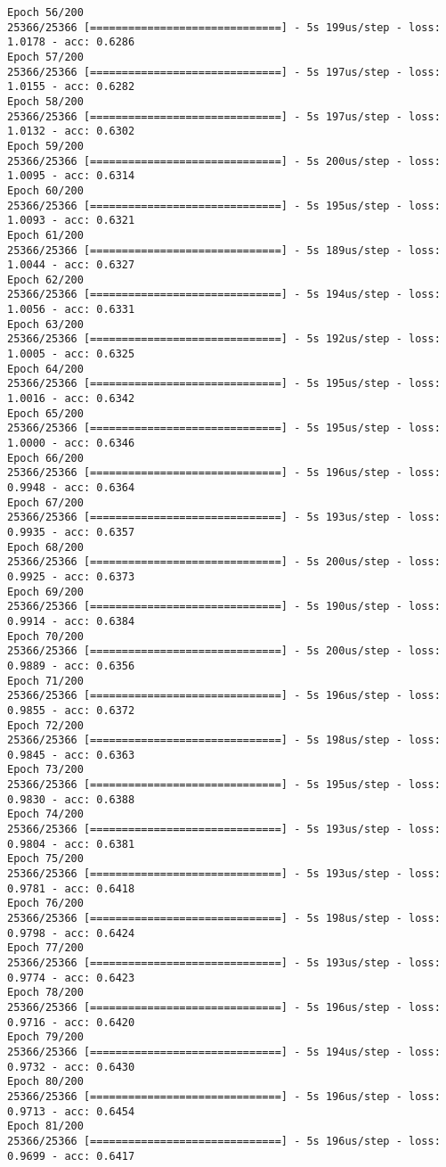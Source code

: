 \documentclass[11pt]{article}
\begin{document}
\begin{Verbatim}[commandchars=\\\{\}]
Epoch 56/200
25366/25366 [==============================] - 5s 199us/step - loss: 1.0178 - acc: 0.6286
Epoch 57/200
25366/25366 [==============================] - 5s 197us/step - loss: 1.0155 - acc: 0.6282
Epoch 58/200
25366/25366 [==============================] - 5s 197us/step - loss: 1.0132 - acc: 0.6302
Epoch 59/200
25366/25366 [==============================] - 5s 200us/step - loss: 1.0095 - acc: 0.6314
Epoch 60/200
25366/25366 [==============================] - 5s 195us/step - loss: 1.0093 - acc: 0.6321
Epoch 61/200
25366/25366 [==============================] - 5s 189us/step - loss: 1.0044 - acc: 0.6327
Epoch 62/200
25366/25366 [==============================] - 5s 194us/step - loss: 1.0056 - acc: 0.6331
Epoch 63/200
25366/25366 [==============================] - 5s 192us/step - loss: 1.0005 - acc: 0.6325
Epoch 64/200
25366/25366 [==============================] - 5s 195us/step - loss: 1.0016 - acc: 0.6342
Epoch 65/200
25366/25366 [==============================] - 5s 195us/step - loss: 1.0000 - acc: 0.6346
Epoch 66/200
25366/25366 [==============================] - 5s 196us/step - loss: 0.9948 - acc: 0.6364
Epoch 67/200
25366/25366 [==============================] - 5s 193us/step - loss: 0.9935 - acc: 0.6357
Epoch 68/200
25366/25366 [==============================] - 5s 200us/step - loss: 0.9925 - acc: 0.6373
Epoch 69/200
25366/25366 [==============================] - 5s 190us/step - loss: 0.9914 - acc: 0.6384
Epoch 70/200
25366/25366 [==============================] - 5s 200us/step - loss: 0.9889 - acc: 0.6356
Epoch 71/200
25366/25366 [==============================] - 5s 196us/step - loss: 0.9855 - acc: 0.6372
Epoch 72/200
25366/25366 [==============================] - 5s 198us/step - loss: 0.9845 - acc: 0.6363
Epoch 73/200
25366/25366 [==============================] - 5s 195us/step - loss: 0.9830 - acc: 0.6388
Epoch 74/200
25366/25366 [==============================] - 5s 193us/step - loss: 0.9804 - acc: 0.6381
Epoch 75/200
25366/25366 [==============================] - 5s 193us/step - loss: 0.9781 - acc: 0.6418
Epoch 76/200
25366/25366 [==============================] - 5s 198us/step - loss: 0.9798 - acc: 0.6424
Epoch 77/200
25366/25366 [==============================] - 5s 193us/step - loss: 0.9774 - acc: 0.6423
Epoch 78/200
25366/25366 [==============================] - 5s 196us/step - loss: 0.9716 - acc: 0.6420
Epoch 79/200
25366/25366 [==============================] - 5s 194us/step - loss: 0.9732 - acc: 0.6430
Epoch 80/200
25366/25366 [==============================] - 5s 196us/step - loss: 0.9713 - acc: 0.6454
Epoch 81/200
25366/25366 [==============================] - 5s 196us/step - loss: 0.9699 - acc: 0.6417

\end{Verbatim}
\end{document}
